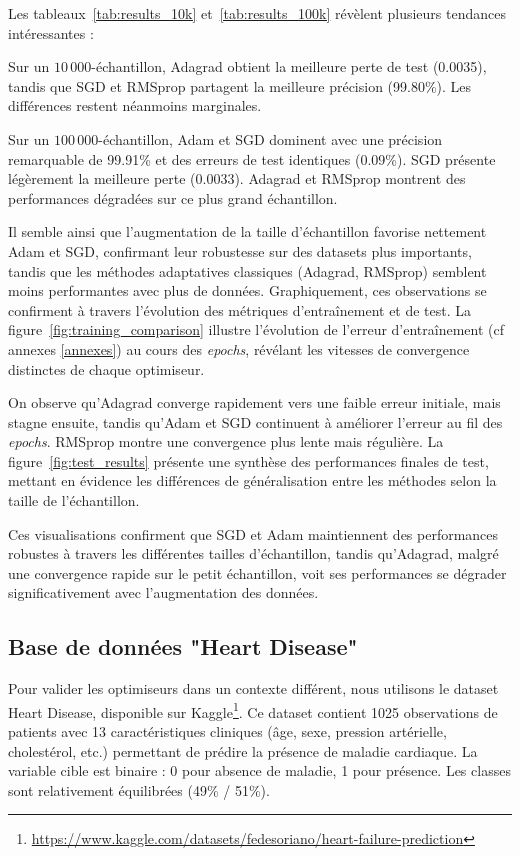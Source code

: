 \documentclass[a4paper,12pt]{article}
\begin{document}
Les tableaux~\ref{tab:results_10k} et~\ref{tab:results_100k} révèlent plusieurs tendances intéressantes : 
\par Sur un $10\,000$-échantillon, Adagrad obtient la meilleure perte de test (0.0035), tandis que SGD et RMSprop partagent la meilleure précision (99.80\%). Les différences restent néanmoins marginales. 
\par Sur un $100\,000$-échantillon, Adam et SGD dominent avec une précision remarquable de 99.91\% et des erreurs de test identiques (0.09\%). SGD présente légèrement la meilleure perte (0.0033). Adagrad et RMSprop montrent des performances dégradées sur ce plus grand échantillon.
\par Il semble ainsi que l'augmentation de la taille d'échantillon favorise nettement Adam et SGD, confirmant leur robustesse sur des datasets plus importants, tandis que les méthodes adaptatives classiques (Adagrad, RMSprop) semblent moins performantes avec plus de données.
Graphiquement, ces observations se confirment à travers l'évolution des métriques d'entraînement et de test. La figure~\ref{fig:training_comparison} illustre l'évolution de l'erreur d'entraînement (cf annexes \ref{annexes}) au cours des \textit{epochs}, révélant les vitesses de convergence distinctes de chaque optimiseur.
\par On observe qu'Adagrad converge rapidement vers une faible erreur initiale, mais stagne ensuite, tandis qu'Adam et SGD continuent à améliorer l'erreur au fil des \textit{epochs}. RMSprop montre une convergence plus lente mais régulière.
La figure~\ref{fig:test_results} présente une synthèse des performances finales de test, mettant en évidence les différences de généralisation entre les méthodes selon la taille de l'échantillon.
\par Ces visualisations confirment que SGD et Adam maintiennent des performances robustes à travers les différentes tailles d'échantillon, tandis qu'Adagrad, malgré une convergence rapide sur le petit échantillon, voit ses performances se dégrader significativement avec l'augmentation des données.

\subsection{Base de données "Heart Disease"}
Pour valider les optimiseurs dans un contexte différent, nous utilisons le dataset Heart Disease, disponible sur Kaggle\footnote{\url{https://www.kaggle.com/datasets/fedesoriano/heart-failure-prediction}}. Ce dataset contient 1025 observations de patients avec 13 caractéristiques cliniques (âge, sexe, pression artérielle, cholestérol, etc.) permettant de prédire la présence de maladie cardiaque. La variable cible est binaire : 0 pour absence de maladie, 1 pour présence. Les classes sont relativement équilibrées (49\% / 51\%).
\end{document}
